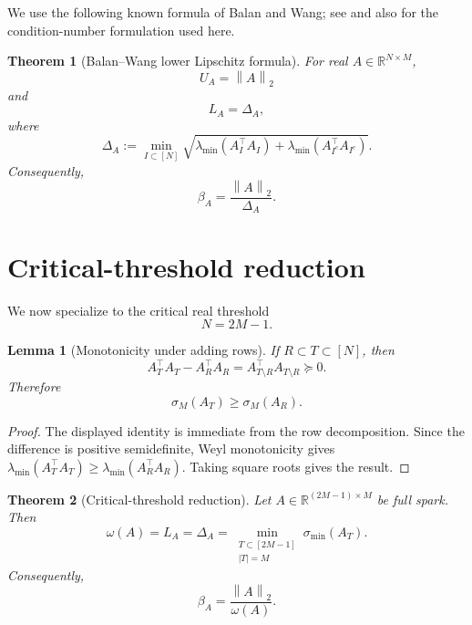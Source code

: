 \documentclass[11pt]{article}
\newtheorem{theorem}{Theorem}
\newtheorem{lemma}{Lemma}
\newcommand{\R}{\mathbb R}
\newcommand{\1}{\mathbf 1}
\newcommand{\norm}[1]{\left\lVert #1\right\rVert}
\newcommand{\smin}{\sigma_{\min}}
\begin{document}
We use the following known formula of Balan and Wang; see \cite{BalanWang2015} and also \cite{XiaXuXu2024} for the condition-number formulation used here.

\begin{theorem}[Balan--Wang lower Lipschitz formula]
For real \(A\in\R^{N\times M}\),
\[
        U_A=\norm{A}_2
\]
and
\[
        L_A=\Delta_A,
\]
where
\[
        \Delta_A
        :=
        \min_{I\subset[N]}
        \sqrt{
        \lambda_{\min}(A_I^\top A_I)
        +
        \lambda_{\min}(A_{I^c}^\top A_{I^c})
        }.
\]
Consequently,
\[
        \beta_A=\frac{\norm{A}_2}{\Delta_A}.
\]
\end{theorem}

\section{Critical-threshold reduction}
\label{sec:critical-threshold}

We now specialize to the critical real threshold
\[
        N=2M-1.
\]

\begin{lemma}[Monotonicity under adding rows]
If \(R\subset T\subset[N]\), then
\[
        A_T^\top A_T-A_R^\top A_R=A_{T\setminus R}^\top A_{T\setminus R}\succeq0.
\]
Therefore
\[
        \sigma_M(A_T)\ge \sigma_M(A_R).
\]
\end{lemma}

\begin{proof}
The displayed identity is immediate from the row decomposition.  Since the difference is
positive semidefinite, Weyl monotonicity gives
\(\lambda_{\min}(A_T^\top A_T)\ge\lambda_{\min}(A_R^\top A_R)\).  Taking square roots
gives the result.
\end{proof}

\begin{theorem}[Critical-threshold reduction]
Let \(A\in\R^{(2M-1)\times M}\) be full spark.  Then
\[
        \boxed{
        \omega(A)=L_A=\Delta_A
        =
        \min_{\substack{T\subset[2M-1]\\ |T|=M}}
        \smin(A_T).
        }
\]
Consequently,
\[
        \beta_A
        =
        \frac{\norm{A}_2}{\omega(A)}.
\]
\end{theorem}
\end{document}
